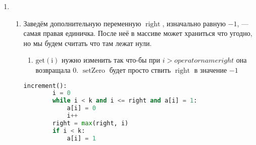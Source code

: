 \documentclass[a4paper, 11pt]{article}
\begin{document}
\begin{enumerate}
\item
\begin{enumerate}
	 время работы increment в худшем случае составит k операций\\
	Это значение достигается когда массив а заполнен единицами.\\

	 сколько раз мы затрагивали бит с номером i.\\
	Первый бит меняется каждую операцию, второй бит - каждую вторую.
	Нетрудно заметить что i бит меняет значение только после $2^{i-1}$ операций increment.
	Нулевой бит инвертируется при каждом вызове $\operatorname{increment}$\\
	Итого получаем $n + \frac{n}{2} + \frac{n}{4} + ... + 1 < 2n$\\

	 массив в котором на $k-1$ месте стоит единица, а остальные значения - нули.\\
	Будем чередуя выполнять операции decrement и increment.\\
	Нетрудно заметить что каждая будет выполняться за k простых операций.\\
	Следовательно время работы в худшем случае --- $\mathcal{O}(nk)$.\\

	\item Заведём дополнительную переменную $\operatorname{right}$, изначально равную $-1$, --- самая правая единичка. После неё в массиве может храниться что угодно, но мы будем считать что там лежат нули.
	\begin{enumerate}
		 цикл в $\operatorname{increment}$ дойдет до $   \operatorname{right} + 1$ мы должны остановиться так как помним о том что все элементы после $\operatorname{right}$ равны нулю.\\ Ещё нужно подвинуть $\operatorname{right}$ в случае когда $i > \operatorname{right}$
		\item$\operatorname{get(i)}$ нужно изменить так что-бы при $i > operatorname{right}$ она возвращала $0$.
		 $\operatorname{setZero}$ будет просто ствить   $\operatorname{right}$ в значение $-1$
	\end{enumerate}
	\begin{lstlisting}[language=Python]
	increment():
		i = 0
		while i < k and i <= right and a[i] = 1:
			a[i] = 0
			i++
		right = max(right, i)
		if i < k:
			a[i] = 1


\end{lstlisting}
\end{enumerate}
\end{enumerate}
\end{document}
